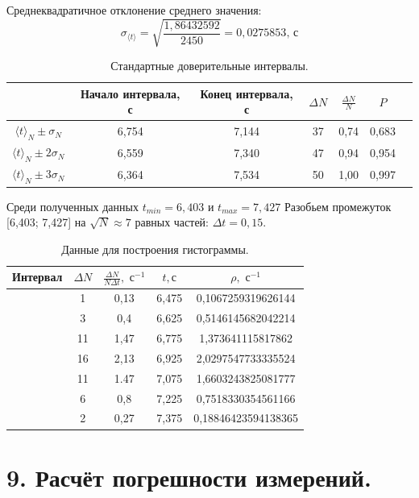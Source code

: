 \documentclass[14pt]{extreport}
\begin{document}
Среднеквадратичное отклонение среднего значения:
\begin{equation*}
    \sigma_{\langle t \rangle} = \sqrt{\frac{1,86432592}{2450}} = 0,0275853 \text{, с}
\end{equation*}

\begin{table}[H]
\caption{Стандартные доверительные интервалы.}
\centering
\begin{tabular}{|c|c|c|c|c|c|c|}
\hline
& Начало интервала, с & Конец интервала, с &  $\Delta N$ & $\frac{\Delta N}{N}$ & $P$ \\ \hline
$\langle t \rangle_N \pm \sigma_N$ & 6,754 & 7,144 & 37 & 0,74 & 0,683\\ \hline
$\langle t \rangle_N \pm 2\sigma_N$ & 6,559 & 7,340 & 47 & 0,94 & 0,954 \\ \hline
$\langle t \rangle_N \pm 3\sigma_N$ & 6,364 & 7,534 & 50 & 1,00 &  0,997 \\ \hline
 \end{tabular}
\end{table}

Среди полученных данных $t_{min} = 6,403$ и $t_{max} = 7,427$ Разобьем промежуток [6,403; 7,427] на $\sqrt{N} \approx 7$ равных частей: $\Delta t =  0,15$.
\begin{table}[H]
\caption{Данные для построения гистограммы.}

\centering
\begin{tabular}{|c|c|c|c|c|}
\hline
Интервал & $\Delta N$ & $\frac{\Delta N}{N \Delta t}, \text{ с}^{-1}$ & $t, \text{с}$ & $\rho, \text{ с}^{-1}$ \\ \hline
[6,40; 6,55] & 1 & 0,13 & 6,475 & 0,1067259319626144 \\ \hline
[6,55 ; 6,70] & 3 & 0,4 & 6,625 & 0,5146145682042214 \\ \hline
[6,70; 6,85] &  11 & 1,47 & 6,775 & 1,373641115817862 \\ \hline
[6,85; 7,00] & 16 & 2,13 & 6,925 & 2,0297547733335524 \\ \hline
[7,00; 7,15] & 11 & 1.47 & 7,075 & 1,6603243825081777 \\ \hline
[7,15; 7,30] & 6 & 0,8 & 7,225 & 0,7518330354561166 \\ \hline
[7,30; 7,45] & 2 & 0,27 & 7,375 & 0,18846423594138365 \\ \hline

 \end{tabular}
\end{table}

\section*{9. Расчёт погрешности измерений.}
\end{document}
